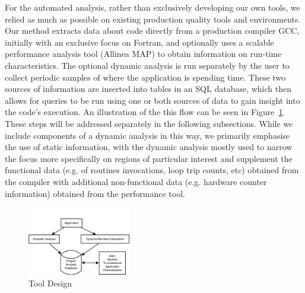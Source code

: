 For the automated analysis, rather than exclusively developing our own tools, we relied as much as possible on existing production quality tools and environments.
Our method extracts data about code directly from a production compiler \ac{GCC}, initially with an exclusive focus on Fortran, and optionally uses a scalable performance analysis tool (Allinea MAP) to obtain information on run-time characteristics.
The optional dynamic analysis is run separately by the user to collect periodic samples of where the application is spending time.
These two sources of information are inserted into tables in an \acs{SQL} database, which then allows for queries to be run using one or both sources of data to gain insight into the code's execution.
An illustration of the this flow can be seen in Figure~\ref{fig:design}.
These steps will be addressed separately in the following subsections.
While we include components of a dynamic analysis in this way, we primarily emphasise the use of static information, with the dynamic analysis mostly used to narrow the focus more specifically on regions of particular interest and supplement the functional data (e.g. of routines invocations, loop trip counts, etc) obtained from the compiler with additional non-functional data (e.g. hardware counter information) obtained from the performance tool.

\begin{figure}
\begin{center}
\includegraphics[width=0.4\textwidth]{images/design.png}
\end{center}
\caption{Tool Design}
\label{fig:design}
\end{figure}

